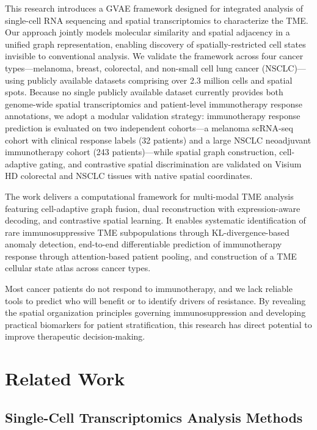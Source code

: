 \documentclass{article}
\begin{document}
This research introduces a GVAE framework designed for integrated analysis of single-cell RNA sequencing and spatial transcriptomics to characterize the TME. Our approach jointly models molecular similarity and spatial adjacency in a unified graph representation, enabling discovery of spatially-restricted cell states invisible to conventional analysis. We validate the framework across four cancer types---melanoma, breast, colorectal, and non-small cell lung cancer (NSCLC)---using publicly available datasets comprising over 2.3 million cells and spatial spots. Because no single publicly available dataset currently provides both genome-wide spatial transcriptomics and patient-level immunotherapy response annotations, we adopt a modular validation strategy: immunotherapy response prediction is evaluated on two independent cohorts---a melanoma scRNA-seq cohort with clinical response labels \citep{sadefeldman2018} (32 patients) and a large NSCLC neoadjuvant immunotherapy cohort \citep{deng2025nsclc} (243 patients)---while spatial graph construction, cell-adaptive gating, and contrastive spatial discrimination are validated on Visium HD colorectal and NSCLC tissues with native spatial coordinates.

The work delivers a computational framework for multi-modal TME analysis featuring cell-adaptive graph fusion, dual reconstruction with expression-aware decoding, and contrastive spatial learning. It enables systematic identification of rare immunosuppressive TME subpopulations through KL-divergence-based anomaly detection, end-to-end differentiable prediction of immunotherapy response through attention-based patient pooling, and construction of a TME cellular state atlas across cancer types.

Most cancer patients do not respond to immunotherapy, and we lack reliable tools to predict who will benefit or to identify drivers of resistance. By revealing the spatial organization principles governing immunosuppression and developing practical biomarkers for patient stratification, this research has direct potential to improve therapeutic decision-making.

\section{Related Work}

\subsection{Single-Cell Transcriptomics Analysis Methods}
\end{document}
